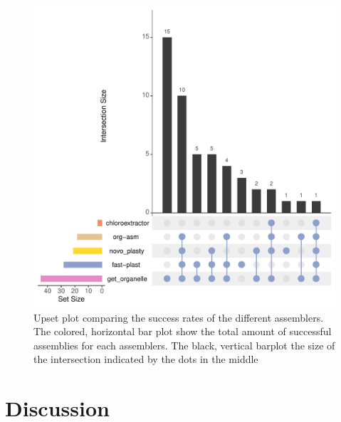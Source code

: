 \begin{figure}[H]
\centering
\includegraphics[height=.45\textheight, width=.95\textwidth]{Figures/upset_novel}
\decoRule
\caption[Upset plot comparing the success rates for novel data sets]{Upset plot comparing the success rates of
  the different assemblers. The colored, horizontal bar plot show the total amount of successful assemblies
  for each assemblers. The black, vertical barplot the size of the intersection indicated by the dots in the
  middle}
\label{fig:upset_novel}
\end{figure}

\section{Discussion} \label{dis_cp}

